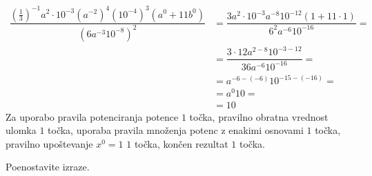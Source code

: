 \documentclass[addpoints]{exam}
\begin{document}
\begin{questions}
\begin{parts}
        \begin{solution}[3cm]
            \begin{align*}
                \dfrac{(\frac{1}{3})^{-1}a^2\cdot 10^{-3}(a^{-2})^4 (10^{-4})^3 (a^0+11b^0)}{(6a^{-3}10^{-8})^2} &= \dfrac{3a^2\cdot 10^{-3}a^{-8} 10^{-12} (1+11\cdot 1)}{6^2a^{-6}10^{-16}}= \\
                                                                                                                &= \dfrac{3\cdot 12 a^{2-8}10^{-3-12}}{36a^{-6}10^{-16}}= \\
                                                                                                                &= a^{-6-(-6)}10^{-15-(-16)}= \\
                                                                                                                &= a^0 10= \\
                                                                                                                &= 10
            \end{align*}
            Za uporabo pravila potenciranja potence $1$ točka, pravilno obratna vrednost ulomka $1$ točka, uporaba pravila množenja potenc z enakimi osnovami $1$ točka, pravilno upoštevanje $x^0=1$ $1$ točka, končen rezultat $1$ točka.
        \end{solution}


    \end{parts}



    \newpage


        \question
        Poenostavite izraze.
\end{questions}
\end{document}
